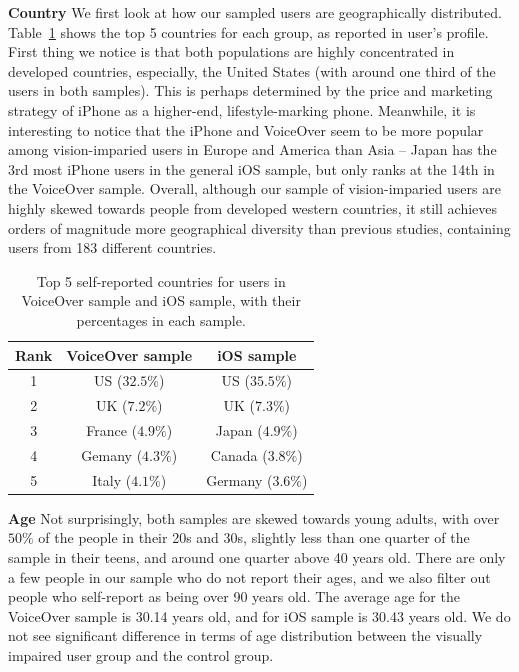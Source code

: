 \documentclass{sigchi}
\newcommand\tabhead[1]{\small\textbf{#1}}
\begin{document}
\textbf{Country} We first look at how our sampled users are geographically distributed. Table~\ref{tab:demographics_country} shows the top 5 countries for each group, as reported in user's profile. First thing we notice is that both populations are highly concentrated in developed countries, especially, the United States (with around one third of the users in both samples). This is perhaps determined by the price and marketing strategy of iPhone as a higher-end, lifestyle-marking phone. Meanwhile, it is interesting to notice that the iPhone and VoiceOver seem to be more popular among vision-imparied users in Europe and America than Asia -- Japan has the 3rd most iPhone users in the general iOS sample, but only ranks at the 14th in the VoiceOver sample. Overall, although our sample of vision-imparied users are highly skewed towards people from developed western countries, it still achieves orders of magnitude more geographical diversity than previous studies, containing users from 183 different countries.

\begin{table}
  \centering
  \begin{tabular}{|c|c|c|}
    \hline
    \tabhead{Rank} &
      VoiceOver sample & iOS sample \\
    \hline
    1 & US ($32.5\%$) & US ($35.5\%$) \\
    \hline
    2 & UK ($7.2\%$) &  UK ($7.3\%$)\\
    \hline
   3 & France ($4.9\%$) & Japan ($4.9\%$) \\
    \hline 
   4 & Gemany ($4.3\%$) & Canada ($3.8\%$)\\
   \hline
   5 & Italy ($4.1\%$) & Germany ($3.6\%$)\\
   \hline
  \end{tabular}
  \caption{Top 5 self-reported countries for users in VoiceOver sample and iOS sample, with their percentages in each sample. }
  \label{tab:demographics_country}
\end{table}

\textbf{Age}  Not surprisingly, both samples are skewed towards young adults, with over $50\%$ of the people in their 20s and 30s, slightly less than one quarter of the sample in their teens, and around one quarter above 40 years old. There are only a few people in our sample who do not report their ages, and we also filter out people who self-report as being over 90 years old. The average age for the VoiceOver sample is 30.14 years old, and for iOS sample is 30.43 years old. We do not see significant difference in terms of age distribution between the visually impaired user group and the control group.
\end{document}
